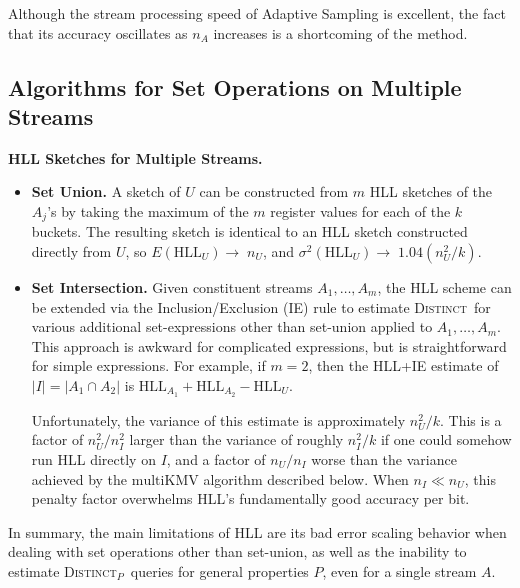 \documentclass{article}
\newcommand{\romHLL}{\mathrm{HLL}}
\newcommand{\romIKMV}{\mathrm{multiKMV}}
\newcommand{\distinctP}{\textsc{Distinct}$_P$}
\newcommand{\distinct}{\textsc{Distinct}}
\begin{document}
Although the stream processing speed of Adaptive Sampling is excellent, the fact that its accuracy oscillates as $n_A$ increases is a shortcoming of the method. 

\subsection{Algorithms for Set Operations on Multiple Streams}
\noindent \textbf{HLL Sketches for Multiple Streams.}\label{subsubHLL2}
 \begin{itemize}
 \item \textbf{Set Union.} A sketch of $U$ can be constructed from $m$ HLL sketches of the $A_j$'s by taking
the maximum of the $m$ register values for each of the $k$ buckets. 
The resulting sketch is identical to an HLL sketch constructed directly from $U$, so
$E(\romHLL_U) \rightarrow\; n_U$, and
$\sigma^2(\romHLL_U) \rightarrow\; 1.04 (n_U^2/k)$.

\item \textbf{Set Intersection.} Given constituent streams $A_1, \dots, A_m$, the HLL scheme can be extended via the Inclusion/Exclusion (IE) rule to estimate \distinct\ 
for various additional set-expressions other than set-union applied to $A_1, \dots, A_m$. 
This approach is awkward for
complicated expressions, but is straightforward for simple expressions. For example, if $m=2$, then
the HLL+IE estimate of $|I| = | A_1 \cap A_2 | $ is $\romHLL_{A_1} + \romHLL_{A_2} - \romHLL_U$.

Unfortunately, the variance of this estimate is approximately
$n_U^2/k$. This is a factor of $n^2_U/n^2_I$ larger than the variance
of roughly $n_I^2/k$ if one could somehow run HLL directly on $I$, and a factor of $n_U/n_I$ worse than the variance achieved by
the $\romIKMV$ algorithm described below. When $n_I \ll n_U$, this penalty
factor overwhelms HLL's fundamentally good accuracy per bit.
\end{itemize}
In summary, the main limitations of HLL are its bad error scaling behavior when dealing with set operations other than set-union, 
as well as the inability to estimate \distinctP\ queries for general properties $P$, even for a single stream $A$. \\
\end{document}
